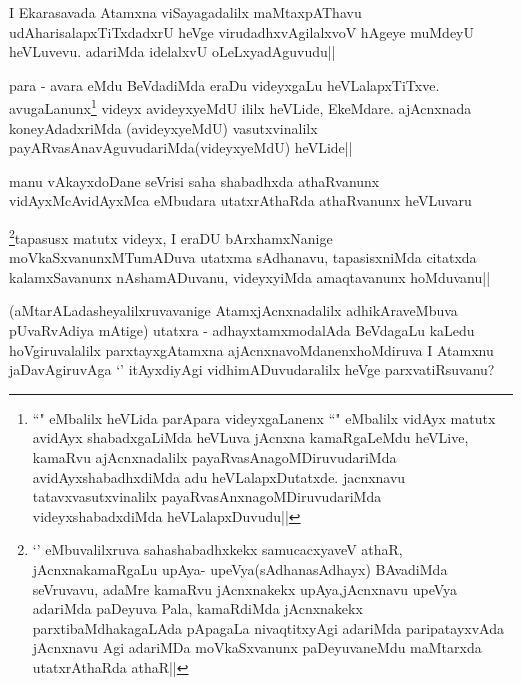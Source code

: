 \begin{artha}
I Ekarasavada Atamxna viSayagadalilx maMtaxpAThavu udAharisalapxTiTxdadxrU heVge virudadhxvAgilalxvoV hAgeye muMdeyU heVLuvevu. adariMda idelalxvU oLeLxyadAguvudu||
\end{artha}

\begin{artha}
para - avara eMdu BeVdadiMda eraDu videyxgaLu heVLalapxTiTxve. avugaLanunx\footnote[1]{``\stext" eMbalilx heVLida parApara videyxgaLanenx ``\stext" eMbalilx vidAyx matutx avidAyx shabadxgaLiMda heVLuva jAcnxna kamaRgaLeMdu heVLive, kamaRvu ajAcnxnadalilx payaRvasAnagoMDiruvudariMda avidAyxshabadhxdiMda adu heVLalapxDutatxde. jacnxnavu tatavxvasutxvinalilx payaRvasAnxnagoMDiruvudariMda videyxshabadxdiMda heVLalapxDuvudu||} videyx avideyxyeMdU ililx heVLide, EkeMdare. ajAcnxnada koneyAdadxriMda (avideyxyeMdU) vasutxvinalilx payARvasAnavAguvudariMda(videyxyeMdU) heVLide||
\end{artha}


\begin{artha}
manu vAkayxdoDane seVrisi saha shabadhxda athaRvanunx vidAyxMcAvidAyxMca eMbudara utatxrAthaRda athaRvanunx heVLuvaru
\end{artha}



\begin{artha}
\footnote[2]{`\stext' eMbuvalilxruva sahashabadhxkekx samucacxyaveV athaR, jAcnxnakamaRgaLu upAya- upeVya(sAdhanasAdhayx) BAvadiMda seVruvavu, adaMre kamaRvu jAcnxnakekx upAya,jAcnxnavu upeVya adariMda paDeyuva Pala, kamaRdiMda jAcnxnakekx   parxtibaMdhakagaLAda pApagaLa nivaqtitxyAgi adariMda paripatayxvAda jAcnxnavu Agi adariMDa moVkaSxvanunx paDeyuvaneMdu maMtarxda utatxrAthaRda athaR||}tapasusx matutx videyx, I eraDU bArxhamxNanige moVkaSxvanunxMTumADuva utatxma sAdhanavu, tapasisxniMda citatxda kalamxSavanunx nAshamADuvanu, videyxyiMda amaqtavanunx hoMduvanu||
\end{artha}

\begin{artha}
(aMtarALadasheyalilxruvavanige AtamxjAcnxnadalilx adhikAraveMbuva pUvaRvAdiya mAtige) utatxra - adhayxtamxmodalAda BeVdagaLu kaLedu hoVgiruvalalilx parxtayxgAtamxna ajAcnxnavoMdanenxhoMdiruva I Atamxnu jaDavAgiruvAga `\stext' itAyxdiyAgi vidhimADuvudaralilx heVge parxvatiRsuvanu?
\end{artha}


